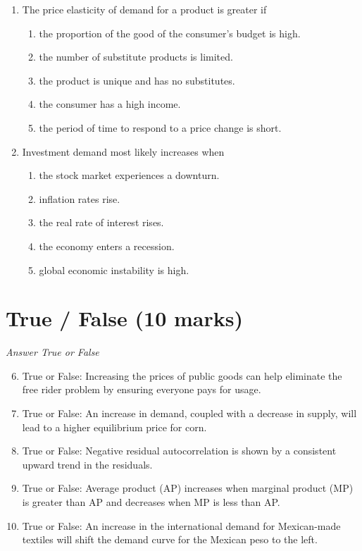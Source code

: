 \documentclass[12pt]{article}
\begin{document}
\begin{enumerate}[label=\arabic*.]
\begin{enumerate}[label=(\alph*)]
\end{enumerate}
\item The price elasticity of demand for a product is greater if
\begin{enumerate}[label=(\alph*)]
    \item the proportion of the good of the consumer's budget is high.
    \item the number of substitute products is limited.
    \item the product is unique and has no substitutes.
    \item the consumer has a high income.
    \item the period of time to respond to a price change is short.
\end{enumerate}
\item Investment demand most likely increases when
\begin{enumerate}[label=(\alph*)]
    \item the stock market experiences a downturn.
    \item inflation rates rise.
    \item the real rate of interest rises.
    \item the economy enters a recession.
    \item global economic instability is high.
\end{enumerate}
\end{enumerate}

\section*{True / False (10 marks)}
\textit{Answer True or False}
\begin{enumerate}[label=\arabic*.]
\setcounter{enumi}{5}
\item True or False: Increasing the prices of public goods can help eliminate the free rider problem by ensuring everyone pays for usage.
\item True or False: An increase in demand, coupled with a decrease in supply, will lead to a higher equilibrium price for corn.
\item True or False: Negative residual autocorrelation is shown by a consistent upward trend in the residuals.
\item True or False: Average product (AP) increases when marginal product (MP) is greater than AP and decreases when MP is less than AP.
\item True or False: An increase in the international demand for Mexican-made textiles will shift the demand curve for the Mexican peso to the left.
\end{enumerate}
\end{document}
